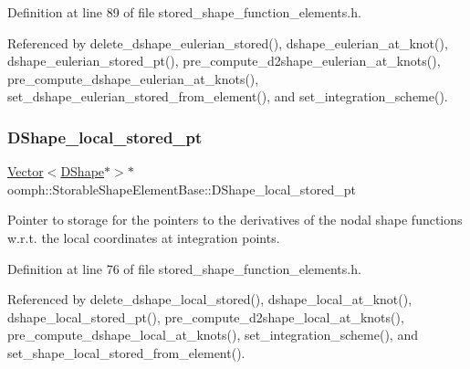 Definition at line 89 of file stored\+\_\+shape\+\_\+function\+\_\+elements.\+h.



Referenced by delete\+\_\+dshape\+\_\+eulerian\+\_\+stored(), dshape\+\_\+eulerian\+\_\+at\+\_\+knot(), dshape\+\_\+eulerian\+\_\+stored\+\_\+pt(), pre\+\_\+compute\+\_\+d2shape\+\_\+eulerian\+\_\+at\+\_\+knots(), pre\+\_\+compute\+\_\+dshape\+\_\+eulerian\+\_\+at\+\_\+knots(), set\+\_\+dshape\+\_\+eulerian\+\_\+stored\+\_\+from\+\_\+element(), and set\+\_\+integration\+\_\+scheme().

\mbox{\label{classoomph_1_1StorableShapeElementBase_a326e9bbeb61f01660f4acf720d95da8a}} 
\subsubsection{\texorpdfstring{D\+Shape\+\_\+local\+\_\+stored\+\_\+pt}{DShape\_local\_stored\_pt}}
{\footnotesize\ttfamily \hyperlink{classoomph_1_1Vector}{Vector}$<$\hyperlink{classoomph_1_1DShape}{D\+Shape}$\ast$$>$$\ast$ oomph\+::\+Storable\+Shape\+Element\+Base\+::\+D\+Shape\+\_\+local\+\_\+stored\+\_\+pt\hspace{0.3cm}{\ttfamily [private]}}



Pointer to storage for the pointers to the derivatives of the nodal shape functions w.\+r.\+t. the local coordinates at integration points. 



Definition at line 76 of file stored\+\_\+shape\+\_\+function\+\_\+elements.\+h.



Referenced by delete\+\_\+dshape\+\_\+local\+\_\+stored(), dshape\+\_\+local\+\_\+at\+\_\+knot(), dshape\+\_\+local\+\_\+stored\+\_\+pt(), pre\+\_\+compute\+\_\+d2shape\+\_\+local\+\_\+at\+\_\+knots(), pre\+\_\+compute\+\_\+dshape\+\_\+local\+\_\+at\+\_\+knots(), set\+\_\+integration\+\_\+scheme(), and set\+\_\+shape\+\_\+local\+\_\+stored\+\_\+from\+\_\+element().

\mbox{\label{classoomph_1_1StorableShapeElementBase_a8538f345668e6a3dca096c2168dab1c7}} 
